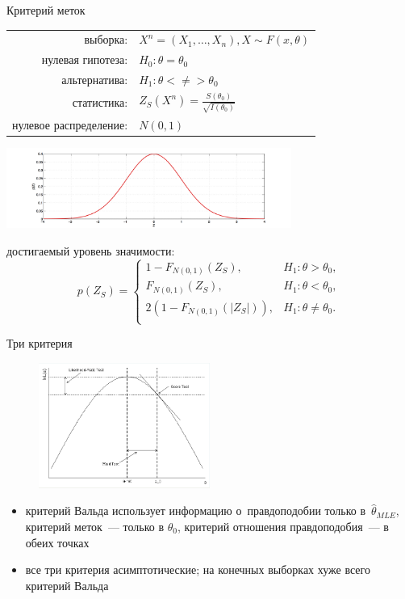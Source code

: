 \documentclass[9pt,pdf,utf8,hyperref={unicode},aspectratio=169]{beamer}
\begin{document}
\begin{frame}{Критерий меток}
	\begin{center}
		\begin{tabular}{rl}
			выборка:                        & $X^n=\left(X_1,\ldots,X_n\right), X\sim F\left(x, \theta\right)$\\
			нулевая гипотеза:               & $H_0\colon \theta=\theta_0$ \\
			альтернатива:                   & $H_1\colon \theta<\neq>\theta_0$ \\
			статистика:                     & $Z_S\left(X^n\right) = \frac{S\left(\theta_0\right)}{\sqrt{I\left(\theta_0\right)}}$ \\
			нулевое распределение:          & $N\left(0,1\right)$\\
		\end{tabular}
		\includegraphics[width=0.7\textwidth]{norm.png}
	\end{center}
	достигаемый уровень значимости:
	$$p\left(Z_S\right) = \begin{cases}
	1-F_{N(0,1)}(Z_S), & H_1 \colon \theta>\theta_0, \\
	F_{N(0,1)}(Z_S), & H_1 \colon \theta<\theta_0, \\
	2\left(1-F_{N(0,1)}(|Z_S|)\right), & H_1 \colon \theta\neq\theta_0. \\
	\end{cases}
	$$
\end{frame}

\begin{frame}{Три критерия}
	\begin{figure}
		\includegraphics[width=0.5\textwidth]{nested_tests.png}
	\end{figure} 
	\begin{itemize}
		\item критерий Вальда использует информацию о~правдоподобии только в~$\hat{\theta}_{MLE}$, критерий меток~--- только в $\theta_0$, критерий отношения правдоподобия~--- в обеих точках
		\item все три критерия асимптотические; на конечных выборках хуже всего критерий Вальда
	\end{itemize}

\end{frame}
\end{document}
